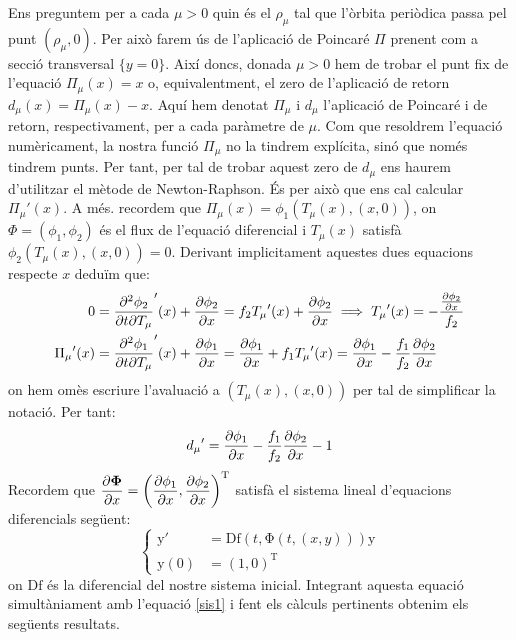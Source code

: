 \documentclass[a4paper]{article}
\newcommand{\vf}[1]{\boldsymbol{\mathrm{#1}}} %
\theoremstyle{definition}
\begin{document}
Ens preguntem per a cada $\mu>0$ quin és el $\rho_\mu$ tal que l'òrbita periòdica passa pel punt $(\rho_\mu,0)$. Per això farem ús de l'aplicació de Poincaré $\Pi$ prenent com a secció transversal $\{y=0\}$. Així doncs, donada $\mu>0$ hem de trobar el punt fix de l'equació $\Pi_\mu(x)=x$ o, equivalentment, el zero de l'aplicació de retorn $d_\mu(x)=\Pi_\mu(x) -x$. Aquí hem denotat $\Pi_\mu$ i $d_\mu$ l'aplicació de Poincaré i de retorn, respectivament, per a cada paràmetre de $\mu$. Com que resoldrem l'equació numèricament, la nostra funció $\Pi_\mu$ no la tindrem explícita, sinó que només tindrem punts. Per tant, per tal de trobar aquest zero de $d_\mu$ ens haurem d'utilitzar el mètode de Newton-Raphson. És per això que ens cal calcular ${\Pi_\mu}'(x)$. A més. recordem que $\Pi_\mu(x)=\phi_1(T_\mu(x), (x, 0))$, on $\Phi=(\phi_1,\phi_2)$ és el flux de l'equació diferencial i $T_\mu(x)$ satisfà $\phi_2(T_\mu(x),(x,0))= 0$. Derivant implicitament aquestes dues equacions respecte $x$ deduïm que:
\begin{align}
  \nonumber 0                 & =\pdv{\phi_2}{t}{T_\mu}'(x) + \pdv{\phi_2}{x}= f_2 {T_\mu}'(x) + \pdv{\phi_2}{x} \implies {T_\mu}'(x) = -\frac{\pdv{\phi_2}{x}}{f_2} \\
  \label{eqPoin}{\Pi_\mu}'(x) & =\pdv{\phi_1}{t}{T_\mu}'(x) + \pdv{\phi_1}{x}= \pdv{\phi_1}{x} + f_1{T_\mu}'(x) =\pdv{\phi_1}{x} - \frac{f_1}{f_2} \pdv{\phi_2}{x}
\end{align}
on hem omès escriure l'avaluació a $(T_\mu(x),(x,0))$ per tal de simplificar la notació. Per tant:
$${d_\mu}'=\pdv{\phi_1}{x} - \frac{f_1}{f_2} \pdv{\phi_2}{x} - 1$$
Recordem que $\displaystyle\pdv{\vf\Phi}{x}(t,(x,y))={\left(\pdv{\phi_1}{x},\pdv{\phi_2}{x}\right)}^\mathrm{T}$ satisfà el sistema lineal d'equacions diferencials següent:
\begin{equation}
  \left\{
  \begin{aligned}
    \vf{y}'   & =\vf{Df}(t,\vf\Phi(t,(x,y)))\vf{y} \\
    \vf{y}(0) & ={(1,0)}^\mathrm{T}
  \end{aligned}
  \right.
\end{equation}
on $\vf{Df}$ és la diferencial del nostre sistema inicial. Integrant aquesta equació simultàniament amb l'equació \eqref{sis1} i fent els càlculs pertinents obtenim els següents resultats.

\hspace{2cm}
\end{document}
